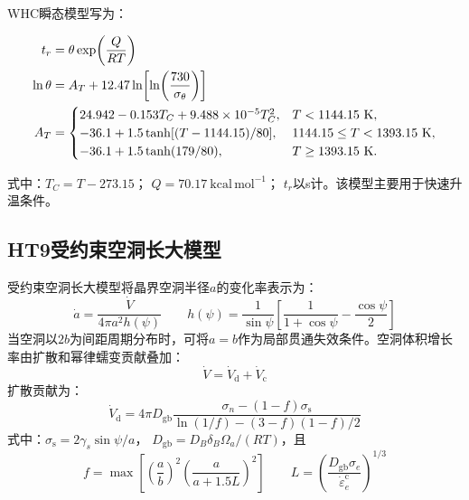 WHC瞬态模型写为\cite{HuangTransientFailureBehavior1994}：

\begingroup
\allowdisplaybreaks[4] %

\begin{align}
	t_r
	&=\theta\exp\!\left(\frac{Q}{RT}\right)
	\notag\\
	\ln\theta
	&=A_T+12.47\ln\!\left[
		\ln\!\left(\frac{730}{\sigma_\theta}\right)
	\right]
	\notag\\
	A_T
	&=
	\begin{cases}
		24.942-0.153T_C
		+9.488\times10^{-5}T_C^2,
		&T<1144.15\ \mathrm{K},\\
		-36.1+1.5\tanh[(T-1144.15)/80],
		&1144.15\leq T<1393.15\ \mathrm{K},\\
		-36.1+1.5\tanh(179/80),
		&T\geq1393.15\ \mathrm{K}.
	\end{cases}
	\label{eq:appendix_ht9_whc_failure_model}
\end{align}

\endgroup

\noindent
式中：$T_C=T-273.15$；
$Q=70.17\ \mathrm{kcal\,mol^{-1}}$；
$t_r$以s计。该模型主要用于快速升温条件。

\subsection{HT9受约束空洞长大模型}

受约束空洞长大模型将晶界空洞半径$a$的变化率表示为\cite{TVERGAARD1985447,KARAHAN2010283}：
\begin{equation}
	\dot a
	=\frac{\dot V}{4\pi a^2h(\psi)}
	\qquad
	h(\psi)
	=\frac{1}{\sin\psi}
	\left[
	\frac{1}{1+\cos\psi}-\frac{\cos\psi}{2}
	\right]
	\label{eq:appendix_ht9_cavity_radius_rate}
\end{equation}
当空洞以$2b$为间距周期分布时，可将$a=b$作为局部贯通失效条件。空洞体积增长率由扩散和幂律蠕变贡献叠加：
\begin{equation}
	\dot V=\dot V_{\mathrm d}+\dot V_{\mathrm c}
	\label{eq:appendix_ht9_cavity_volume_rate}
\end{equation}
扩散贡献为：
\begin{equation}
	\dot V_{\mathrm d}
	=4\pi D_{\mathrm{gb}}
	\frac{\sigma_n-(1-f)\sigma_{\mathrm s}}
	{\ln(1/f)-(3-f)(1-f)/2}
	\label{eq:appendix_ht9_diffusional_cavity_growth}
\end{equation}
\noindent 式中：$\sigma_{\mathrm s}=2\gamma_s\sin\psi/a$，
$D_{\mathrm{gb}}=D_B\delta_B\Omega_a/(RT)$，且
\begin{equation}
	f=\max\!\left[
	\left(\frac{a}{b}\right)^2
	\left(\frac{a}{a+1.5L}\right)^2
	\right]
	\qquad
	L=\left(\frac{D_{\mathrm{gb}}\sigma_e}
	{\dot\varepsilon_e^{\mathrm c}}\right)^{1/3}
	\label{eq:appendix_ht9_cavity_area_fraction}
\end{equation}

